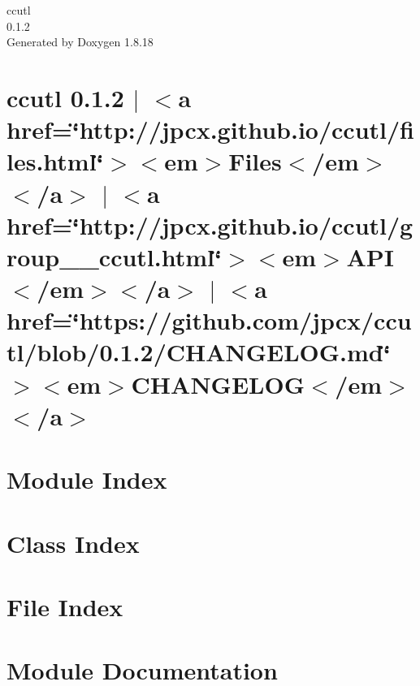 \let\mypdfximage\pdfximage\def\pdfximage{\immediate\mypdfximage}\documentclass[twoside]{book}
\newcommand{\+}{\discretionary{\mbox{\scriptsize$\hookleftarrow$}}{}{}}
\newcommand{\clearemptydoublepage}{%
  \newpage{\pagestyle{empty}\cleardoublepage}%
}
\begin{document}
\hypersetup{pageanchor=false,
             bookmarksnumbered=true,
             pdfencoding=unicode
            }
\begin{titlepage}
\vspace*{7cm}
\begin{center}%
{\Large ccutl \\[1ex]\large 0.\+1.\+2 }\\
\vspace*{1cm}
{\large Generated by Doxygen 1.8.18}\\
\end{center}
\end{titlepage}
\clearemptydoublepage
{}
\tableofcontents
\clearemptydoublepage
{}
\hypersetup{pageanchor=true}

\chapter{ccutl 0.1.2 $\vert$ $<$a href=\char`\"{}http\+://jpcx.\+github.\+io/ccutl/files.\+html\char`\"{}$>$$<$em$>$Files$<$/em$>$$<$/a$>$ $\vert$ $<$a href=\char`\"{}http\+://jpcx.\+github.\+io/ccutl/group\+\_\+\+\_\+ccutl.\+html\char`\"{}$>$$<$em$>$A\+PI$<$/em$>$$<$/a$>$ $\vert$ $<$a href=\char`\"{}https\+://github.\+com/jpcx/ccutl/blob/0.\+1.\+2/\+C\+H\+A\+N\+G\+E\+L\+O\+G.\+md\char`\"{}$>$$<$em$>$C\+H\+A\+N\+G\+E\+L\+OG$<$/em$>$$<$/a$>$}
\label{index}\hypertarget{index}{}
\chapter{Module Index}

\chapter{Class Index}

\chapter{File Index}

\chapter{Module Documentation}



\end{document}
